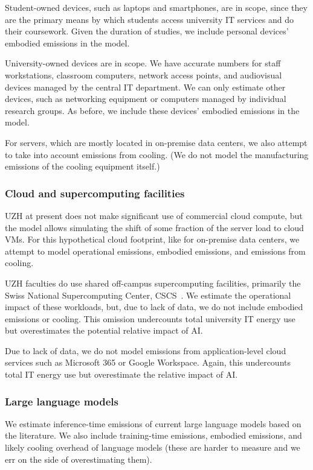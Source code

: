 \documentclass[11pt]{article}
\let\cite\parencite
\begin{document}
Student-owned devices, such as laptops and smartphones, are in scope, since they are the primary means by which students access university IT services and do their coursework. Given the duration of studies, we include personal devices' embodied emissions in the model.

University-owned devices are in scope. We have accurate numbers for staff workstations, classroom computers, network access points, and audiovisual devices managed by the central IT department. We can only estimate other devices, such as networking equipment or computers managed by individual research groups. As before, we include these devices' embodied emissions in the model.

For servers, which are mostly located in on-premise data centers, we also attempt to take into account emissions from cooling. (We do not model the manufacturing emissions of the cooling equipment itself.)

\subsubsection*{Cloud and supercomputing facilities}

UZH at present does not make significant use of commercial cloud compute, but the model allows simulating the shift of some fraction of the server load to cloud VMs. For this hypothetical cloud footprint, like for on-premise data centers, we attempt to model operational emissions, embodied emissions, and emissions from cooling.

UZH faculties do use shared off-campus supercomputing facilities, primarily the Swiss National Supercomputing Center, CSCS~\cite{cscs}. We estimate the operational impact of these workloads, but, due to lack of data, we do not include embodied emissions or cooling. This omission undercounts total university IT energy use but overestimates the potential relative impact of AI.

Due to lack of data, we do not model emissions from application-level cloud services such as Microsoft 365 or Google Workspace. Again, this undercounts total IT energy use but overestimate the relative impact of AI.

\subsubsection*{Large language models}

We estimate inference-time emissions of current large language models based on the literature. We also include training-time emissions, embodied emissions, and likely cooling overhead of language models (these are harder to measure and we err on the side of overestimating them).
\end{document}
